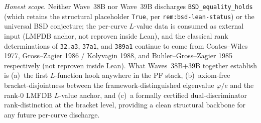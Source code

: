 \begin{remark}
\emph{Honest scope.} Neither Wave~38B nor Wave~39B discharges \texttt{BSD\_equality\_holds} (which retains the structural placeholder \texttt{True}, per \texttt{rem:bsd-lean-status}) or the universal BSD conjecture; the per-curve $L$-value data is consumed as external input (LMFDB anchor, not reproven inside Lean), and the classical rank determinations of \texttt{32.a3}, \texttt{37a1}, and \texttt{389a1} continue to come from Coates--Wiles 1977, Gross--Zagier 1986 / Kolyvagin 1988, and Buhler--Gross--Zagier 1985 respectively (not reproven inside Lean). What Waves~38B+39B together establish is (a)~the first $L$-function hook anywhere in the PF stack, (b)~axiom-free bracket-disjointness between the framework-distinguished eigenvalue $\varphi/e$ and the rank-0 LMFDB $L$-value anchor, and (c)~a formally certified dual-discriminator rank-distinction at the bracket level, providing a clean structural backbone for any future per-curve discharge.
\end{remark}

